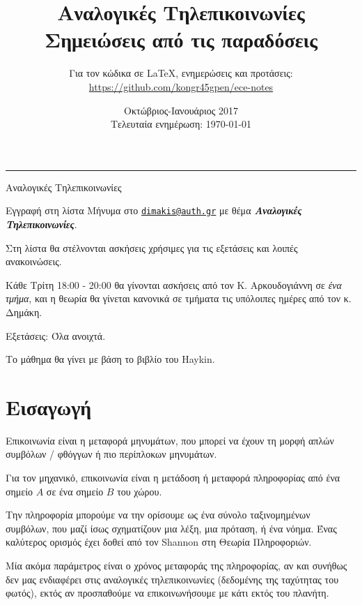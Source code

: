 \documentclass[11pt,a4paper,notitlepage,fleqn]{article}
\title{Αναλογικές Τηλεπικοινωνίες
	\\
	{ 
		\normalsize Σημειώσεις από τις παραδόσεις
	}}
\date{Οκτώβριος-Ιανουάριος 2017
	\\
	{ 
		\small Τελευταία ενημέρωση: \today
	}
}
\author{
	Για τον κώδικα σε \LaTeX, ενημερώσεις και προτάσεις:
	\\
	\url{https://github.com/kongr45gpen/ece-notes}}
\begin{document}
\maketitle

\hrule
\vspace{50pt}
	
Αναλογικές Τηλεπικοινωνίες

\begin{attnbox}{Εγγραφή στη λίστα}
	Μήνυμα στο \href{mailto:dimakis@auth.gr}{\texttt{dimakis@auth.gr}} με θέμα
	\textit{\textbf{Αναλογικές Τηλεπικοινωνίες}}.
	
	\tcblower
	
	Στη λίστα θα στέλνονται ασκήσεις χρήσιμες για τις εξετάσεις και λοιπές ανακοινώσεις.
\end{attnbox}

Κάθε Τρίτη 18:00 - 20:00 θα γίνονται ασκήσεις από τον Κ. Αρκουδογιάννη σε \textit{ένα τμήμα},
και η θεωρία θα γίνεται κανονικά σε τμήματα τις υπόλοιπες ημέρες από τον κ. Δημάκη.

Εξετάσεις: Όλα ανοιχτά.

Το μάθημα θα γίνει με βάση το βιβλίο του Haykin.

\section{Εισαγωγή}
Επικοινωνία είναι η μεταφορά μηνυμάτων, που μπορεί να έχουν τη μορφή απλών συμβόλων / φθόγγων
ή πιο περίπλοκων μηνυμάτων.

Για τον μηχανικό, επικοινωνία είναι η μετάδοση ή μεταφορά πληροφορίας από ένα σημείο \( A \) σε ένα σημείο \( B \) του χώρου.

\begin{center}
\end{center}

Την πληροφορία μπορούμε να την ορίσουμε ως ένα σύνολο ταξινομημένων συμβόλων, που μαζί ίσως
σχηματίζουν μια λέξη, μια πρόταση, ή ένα νόημα. Ένας καλύτερος ορισμός έχει δοθεί από τον
Shannon στη Θεωρία Πληροφοριών.

Μία ακόμα παράμετρος είναι ο χρόνος μεταφοράς της πληροφορίας, αν και συνήθως δεν μας
ενδιαφέρει στις αναλογικές τηλεπικοινωνίες (δεδομένης της ταχύτητας του φωτός), εκτός
αν προσπαθούμε να επικοινωνήσουμε με κάτι εκτός του πλανήτη.
\end{document}
